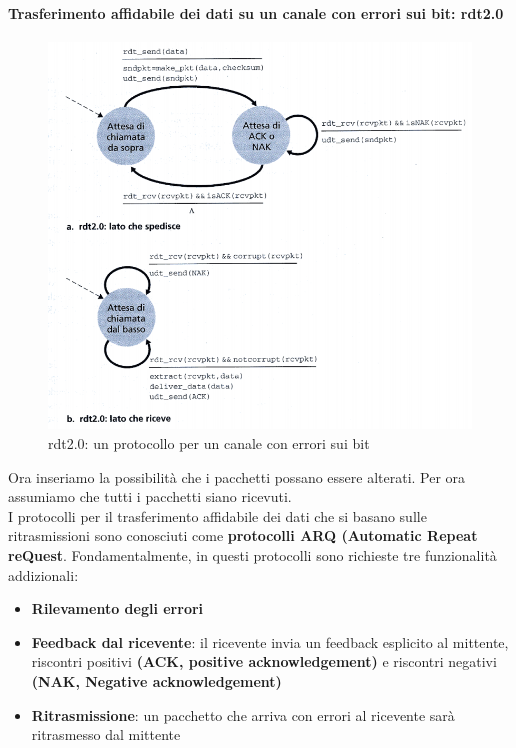 \documentclass[11pt,a4paper]{article}
\begin{document}
\paragraph{Trasferimento affidabile dei dati su un canale con errori sui bit: rdt2.0} \label{par: numSequenza}
\begin{figure}
	\includegraphics[scale=0.6]{img/018.png}
	\caption{rdt2.0: un protocollo per un canale con errori sui bit}
\end{figure}
Ora inseriamo la possibilità che i pacchetti possano essere alterati. Per ora assumiamo che tutti i pacchetti siano ricevuti.\\
I protocolli per il trasferimento affidabile dei dati che si basano sulle ritrasmissioni sono conosciuti come \textbf{protocolli ARQ (Automatic Repeat reQuest}. Fondamentalmente, in questi protocolli sono richieste tre funzionalità addizionali:
\begin{itemize}
	\item \textbf{Rilevamento degli errori}
	\item \textbf{Feedback dal ricevente}: il ricevente invia un feedback esplicito al mittente,  riscontri positivi \textbf{(ACK, positive acknowledgement)} e riscontri negativi \textbf{(NAK, Negative acknowledgement)}
	\item \textbf{Ritrasmissione}: un pacchetto che arriva con errori al ricevente sarà ritrasmesso dal mittente
\end{itemize}
\end{document}
